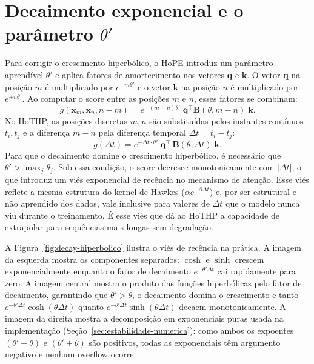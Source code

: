\section{Decaimento exponencial e o parâmetro \texorpdfstring{$\theta'$}{theta'}}
\label{sec:decaimento-theta-prime}

Para corrigir o crescimento hiperbólico, o HoPE \cite{dai_hope_2025} introduz um parâmetro aprendível $\theta'$ e aplica fatores de amortecimento nos vetores $\mathbf{q}$ e $\mathbf{k}$. O vetor $\mathbf{q}$ na posição $m$ é multiplicado por $e^{-m\theta'}$ e o vetor $\mathbf{k}$ na posição $n$ é multiplicado por $e^{+n\theta'}$. Ao computar o score entre as posições $m$ e $n$, esses fatores se combinam:
%
\begin{equation}
    g(\mathbf{x}_m, \mathbf{x}_n, n{-}m) = e^{-(m-n)\theta'} \; \mathbf{q}^\top \mathbf{B}(\theta, m{-}n) \; \mathbf{k}.
    \label{eq:hope-score-discreto}
\end{equation}
%
No HoTHP, as posições discretas $m, n$ são substituídas pelos instantes contínuos $t_i, t_j$ e a diferença $m - n$ pela diferença temporal $\Delta t = t_i - t_j$:
%
\begin{equation}
    g(\Delta t) = e^{-\Delta t \cdot \theta'} \; \mathbf{q}^\top \, \mathbf{B}(\theta, \Delta t) \; \mathbf{k}.
    \label{eq:kernel-hothp-completo}
\end{equation}
%
Para que o decaimento domine o crescimento hiperbólico, é necessário que $\theta' > \max_j \theta_j$. Sob essa condição, o score decresce monotonicamente com $|\Delta t|$, o que introduz um viés exponencial de recência no mecanismo de atenção. Esse viés reflete a mesma estrutura do kernel de Hawkes ($\alpha e^{-\beta \Delta t}$) e, por ser estrutural e não aprendido dos dados, vale inclusive para valores de $\Delta t$ que o modelo nunca viu durante o treinamento. É esse viés que dá ao HoTHP a capacidade de extrapolar para sequências mais longas sem degradação.

A Figura~\ref{fig:decay-hiperbolico} ilustra o viés de recência na prática. A imagem da esquerda mostra os componentes separados: $\cosh$ e $\sinh$ crescem exponencialmente enquanto o fator de decaimento $e^{-\theta'\Delta t}$ cai rapidamente para zero. A imagem central mostra o produto das funções hiperbólicas pelo fator de decaimento, garantindo que $\theta' > \theta$, o decaimento domina o crescimento e tanto $e^{-\theta'\Delta t}\cosh(\theta\Delta t)$ quanto $e^{-\theta'\Delta t}\sinh(\theta\Delta t)$ decaem monotonicamente. A imagem da direita mostra a decomposição em exponenciais puras usada na implementação (Seção~\ref{sec:estabilidade-numerica}): como ambos os expoentes $(\theta' - \theta)$ e $(\theta' + \theta)$ são positivos, todas as exponenciais têm argumento negativo e nenhum overflow ocorre.

